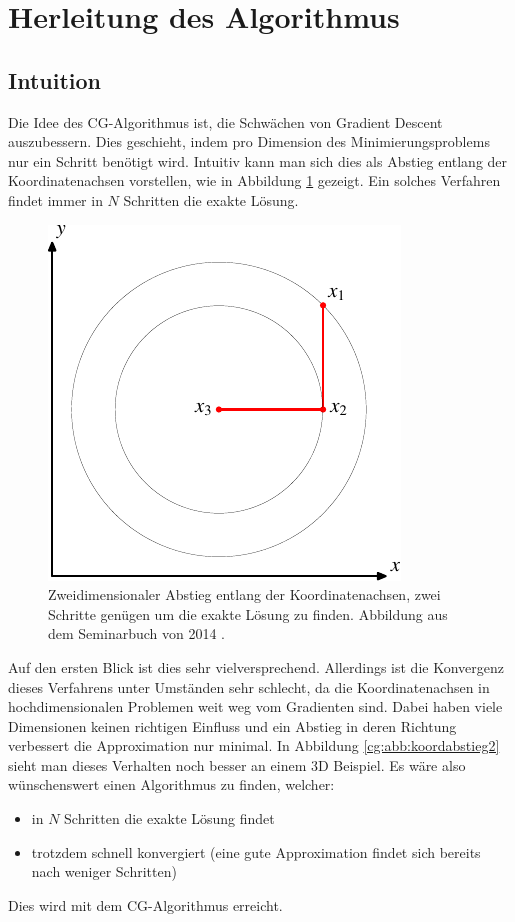 \section{Herleitung des Algorithmus}
\label{cg:section:herleitung}

\subsection{Intuition}
Die Idee des CG-Algorithmus ist, die Schwächen von Gradient Descent auszubessern.
Dies geschieht, indem pro Dimension des Minimierungsproblems nur ein Schritt benötigt wird.
Intuitiv kann man sich dies als Abstieg entlang der Koordinatenachsen vorstellen, wie in Abbildung \ref{cg:abb:koordabstieg} gezeigt.
Ein solches Verfahren findet immer in $N$ Schritten die exakte Lösung.

\begin{figure}	
	\centering
	\includegraphics{papers/cg/images/descent-2}
	\caption{Zweidimensionaler Abstieg entlang der Koordinatenachsen,
		zwei Schritte genügen um die exakte Lösung zu finden. 
		Abbildung aus dem Seminarbuch von 2014 \cite{cg:book:hpc}.}
	\label{cg:abb:koordabstieg}
\end{figure}

Auf den ersten Blick ist dies sehr vielversprechend.
Allerdings ist die Konvergenz dieses Verfahrens unter Umständen sehr schlecht, da die Koordinatenachsen in hochdimensionalen Problemen weit weg vom Gradienten sind.
Dabei haben viele Dimensionen keinen richtigen Einfluss und ein Abstieg in deren Richtung verbessert die Approximation nur minimal.
In Abbildung \ref{cg:abb:koordabstieg2} sieht man dieses Verhalten noch besser an einem 3D Beispiel.
Es wäre also wünschenswert einen Algorithmus zu finden, welcher:
\begin{itemize}
	\item in $N$ Schritten die exakte Lösung findet
	\item trotzdem schnell konvergiert (eine gute Approximation findet sich bereits nach weniger Schritten)
\end{itemize}
Dies wird mit dem CG-Algorithmus erreicht.

